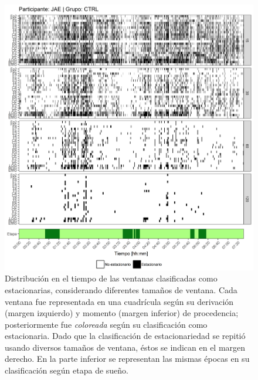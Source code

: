 \begin{figure}
\centering
\includegraphics[width=\linewidth]
{./scripts_graf_res/JAE_patrones_2.png}
\caption[Distribución en el tiempo de las ventanas clasificadas como estacionarias, considerando diferentes tamaños de ventana]{Distribución en el tiempo de las ventanas clasificadas como estacionarias, considerando diferentes tamaños de ventana. 
Cada ventana fue representada en una cuadrícula según su derivación (margen izquierdo) y momento (margen inferior) de procedencia; posteriormente fue \textit{coloreada} según su clasificación como estacionaria.
Dado que la clasificación de estacionariedad se repitió usando diversos tamaños de ventana, éstos se indican en el margen derecho.
En la parte inferior se representan las mismas épocas en su clasificación según etapa de sueño.}
\end{figure}


